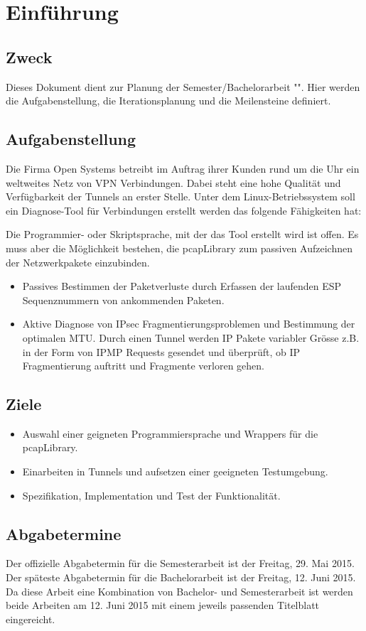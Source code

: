 \section{Einführung}
\label{sec:Einführung}

\subsection{Zweck}
Dieses Dokument dient zur Planung der Semester/Bachelorarbeit "\tool ". Hier werden die Aufgabenstellung, die Iterationsplanung und die Meilensteine definiert.

\subsection{Aufgabenstellung}
Die Firma Open Systems betreibt im Auftrag ihrer Kunden rund um die Uhr ein weltweites Netz von VPN Verbindungen. Dabei steht eine hohe Qualität und Verfügbarkeit der \ipsec Tunnels an erster Stelle.
Unter dem Linux-Betriebssystem soll ein Diagnose-Tool für \ipsec Verbindungen erstellt werden das folgende Fähigkeiten hat:

Die Programmier- oder Skriptsprache, mit der das Tool erstellt wird ist offen. Es muss aber die Möglichkeit bestehen, die pcapLibrary zum passiven Aufzeichnen der Netzwerkpakete einzubinden.

\begin{itemize}
	\item Passives Bestimmen der \ipsec Paketverluste durch Erfassen der laufenden ESP Sequenznummern von ankommenden \ipsec Paketen.
	\item Aktive Diagnose von IPsec Fragmentierungsproblemen und Bestimmung der optimalen MTU. Durch einen Tunnel werden IP Pakete variabler Grösse z.B. in der Form von IPMP Requests gesendet und überprüft, ob \acs{IP} Fragmentierung auftritt und Fragmente verloren gehen.
\end{itemize}

\subsection{Ziele}

\begin{itemize}

  \item Auswahl einer geigneten Programmiersprache und Wrappers für die pcapLibrary.
  \item Einarbeiten in \ipsec Tunnels und aufsetzen einer geeigneten Testumgebung.
  \item Spezifikation, Implementation und Test der \tool Funktionalität.

\end{itemize}

\subsection{Abgabetermine}
Der offizielle Abgabetermin für die Semesterarbeit ist der Freitag, 29. Mai 2015.
Der späteste Abgabetermin für die Bachelorarbeit ist der Freitag, 12. Juni 2015.
Da diese Arbeit eine Kombination von Bachelor- und Semesterarbeit ist werden beide Arbeiten am 12. Juni 2015 mit einem jeweils passenden Titelblatt eingereicht. 